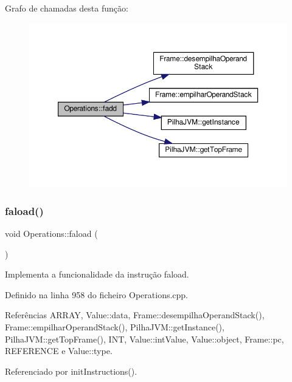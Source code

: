 Grafo de chamadas desta função\+:\nopagebreak
\begin{figure}[H]
\begin{center}
\leavevmode
\includegraphics[width=350pt]{classOperations_a01a07c700f0f1574552437b76f3fdcb4_cgraph}
\end{center}
\end{figure}
\mbox{\label{classOperations_ac22c02d88fa894cafd3f53c54d91409d}} 
\subsubsection{\texorpdfstring{faload()}{faload()}}
{\footnotesize\ttfamily void Operations\+::faload (\begin{DoxyParamCaption}{ }\end{DoxyParamCaption})\hspace{0.3cm}{\ttfamily [private]}}



Implementa a funcionalidade da instrução faload. 



Definido na linha 958 do ficheiro Operations.\+cpp.



Referências A\+R\+R\+AY, Value\+::data, Frame\+::desempilha\+Operand\+Stack(), Frame\+::empilhar\+Operand\+Stack(), Pilha\+J\+V\+M\+::get\+Instance(), Pilha\+J\+V\+M\+::get\+Top\+Frame(), I\+NT, Value\+::int\+Value, Value\+::object, Frame\+::pc, R\+E\+F\+E\+R\+E\+N\+CE e Value\+::type.



Referenciado por init\+Instructions().

